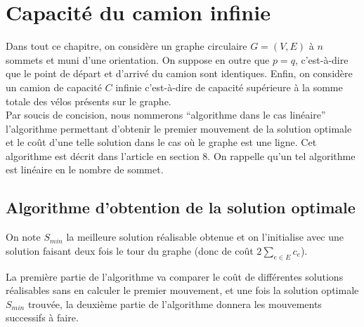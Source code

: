 \chapter{Capacité du camion infinie}

Dans tout ce chapitre, on considère un graphe circulaire $G = (V,E)$ à $n$ sommets et muni d'une orientation. On suppose en outre que $p=q$, c'est-à-dire que le point de départ et d'arrivé du camion sont identiques. Enfin, on considère un camion de capacité $C$ infinie c'est-à-dire de capacité supérieure à la somme totale des vélos présents sur le graphe.
\\

Par soucis de concision, nous nommerons ``algorithme dans le cas linéaire'' l'algorithme permettant d'obtenir le premier mouvement de la solution optimale et le coût d'une telle solution dans le cas où le graphe est une ligne. Cet algorithme est décrit dans l'article \cite{Benchimol2011} en section 8. On rappelle qu'un tel algorithme est linéaire en le nombre de sommet.

\section{Algorithme d'obtention de la solution optimale}
\label{Algorithme circulaire infini}

On note $S_{min}$ la meilleure solution réalisable obtenue et on l'initialise avec une solution faisant deux fois le tour du graphe (donc de coût $2\sum_{e \in E}c_e$).

La première partie de l'algorithme va comparer le coût de différentes solutions réalisables sans en calculer le premier mouvement, et une fois la solution optimale $S_{min}$ trouvée, la deuxième partie de l'algorithme donnera les mouvements successifs à faire.
\\

